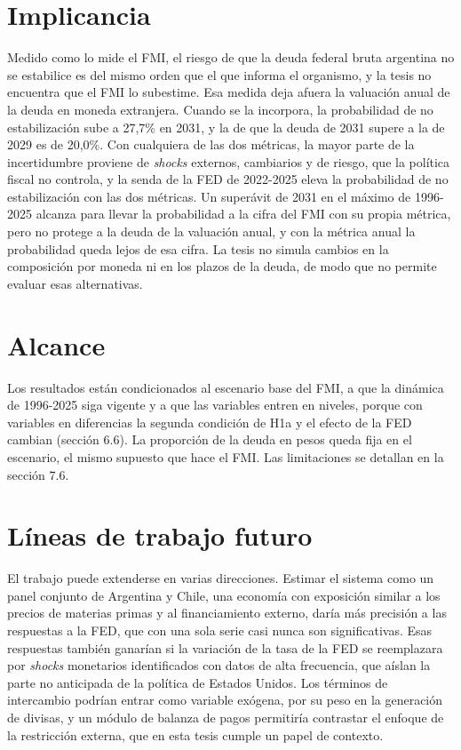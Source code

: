 \section{Implicancia}

Medido como lo mide el FMI, el riesgo de que la deuda federal bruta
argentina no se estabilice es del mismo orden que el que informa el
organismo, y la tesis no encuentra que el FMI lo subestime. Esa medida
deja afuera la valuación anual de la deuda en moneda extranjera. Cuando
se la incorpora, la probabilidad de no estabilización sube a 27,7\% en
2031, y la de que la deuda de 2031 supere a la de 2029 es de 20,0\%. Con
cualquiera de las dos métricas, la mayor parte de la incertidumbre
proviene de \emph{shocks} externos, cambiarios y de riesgo, que la
política fiscal no controla, y la senda de la FED de 2022-2025 eleva la
probabilidad de no estabilización con las dos métricas. Un superávit de
2031 en el máximo de 1996-2025 alcanza para llevar la probabilidad a la
cifra del FMI con su propia métrica, pero no protege a la deuda de la
valuación anual, y con la métrica anual la probabilidad queda lejos de
esa cifra. La tesis no simula cambios en la composición por moneda ni en
los plazos de la deuda, de modo que no permite evaluar esas
alternativas.

\section{Alcance}

Los resultados están condicionados al escenario base del FMI, a que la
dinámica de 1996-2025 siga vigente y a que las variables entren en
niveles, porque con variables en diferencias la segunda condición de H1a
y el efecto de la FED cambian (sección 6.6). La proporción de la deuda
en pesos queda fija en el escenario, el mismo supuesto que hace el FMI.
Las limitaciones se detallan en la sección 7.6.

\section{Líneas de trabajo futuro}

El trabajo puede extenderse en varias direcciones. Estimar el sistema
como un panel conjunto de Argentina y Chile, una economía con exposición
similar a los precios de materias primas y al financiamiento externo,
daría más precisión a las respuestas a la FED, que con una sola serie
casi nunca son significativas. Esas respuestas también ganarían si la
variación de la tasa de la FED se reemplazara por \emph{shocks}
monetarios identificados con datos de alta frecuencia, que aíslan la
parte no anticipada de la política de Estados Unidos. Los términos de
intercambio podrían entrar como variable exógena, por su peso en la
generación de divisas, y un módulo de balanza de pagos permitiría
contrastar el enfoque de la restricción externa, que en esta tesis
cumple un papel de contexto.
